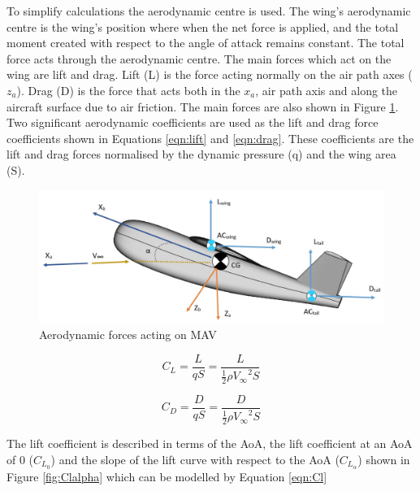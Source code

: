 To simplify calculations the aerodynamic centre is used. The wing's aerodynamic centre is the wing's position where when the net force is applied, and the total moment created with respect to the angle of attack remains constant. The total force acts through the aerodynamic centre. The main forces which act on the wing are lift and drag. Lift (L) is the force acting normally on the air path axes ($z_a$). Drag (D) is the force that acts both in the $x_a$, air path axis and along the aircraft surface due to air friction. The main forces are also shown in Figure \ref{fig:aeroforces}.
Two significant aerodynamic coefficients are used as the lift and drag force coefficients shown in Equations \ref{eqn:lift} and \ref{eqn:drag}. These coefficients are the lift and drag forces normalised by the dynamic pressure (\acrshort{q}) and the wing area (\acrshort{S}). 


\begin{figure}[H]
  \centering
  \includegraphics[width=1\linewidth]{03_LiteratureReview/Figs/Aeroforces2.JPG}
  \caption{Aerodynamic forces acting on \acrshort{MAV}}
  \label{fig:aeroforces}
\end{figure}



\begin{equation}
    C_L = \frac{L}{qS} = \frac{L}{\frac{1}{2}\rho {V_\infty}^2 S}
    \label{eqn:lift}
\end{equation}

\begin{equation}
     C_D = \frac{D}{qS} = \frac{D}{\frac{1}{2}\rho {V_\infty}^2 S}
     \label{eqn:drag}
\end{equation}

The lift coefficient is described in terms of the \acrshort{AoA}, the lift coefficient at an \acrshort{AoA} of 0 ($C_{L_0}$) and the slope of the lift curve with respect to the \acrshort{AoA} ($C_{L_\alpha}$) shown in Figure \ref{fig:Clalpha} which can be modelled by Equation \ref{eqn:Cl}

